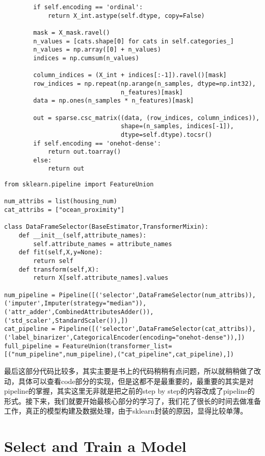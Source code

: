 \documentclass[UTF8]{ctexart}
\begin{document}
\begin{lstlisting}
        if self.encoding == 'ordinal':
            return X_int.astype(self.dtype, copy=False)

        mask = X_mask.ravel()
        n_values = [cats.shape[0] for cats in self.categories_]
        n_values = np.array([0] + n_values)
        indices = np.cumsum(n_values)

        column_indices = (X_int + indices[:-1]).ravel()[mask]
        row_indices = np.repeat(np.arange(n_samples, dtype=np.int32),
                                n_features)[mask]
        data = np.ones(n_samples * n_features)[mask]

        out = sparse.csc_matrix((data, (row_indices, column_indices)),
                                shape=(n_samples, indices[-1]),
                                dtype=self.dtype).tocsr()
        if self.encoding == 'onehot-dense':
            return out.toarray()
        else:
            return out
\end{lstlisting}

\begin{lstlisting}
from sklearn.pipeline import FeatureUnion

num_attribs = list(housing_num)
cat_attribs = ["ocean_proximity"]

class DataFrameSelector(BaseEstimator,TransformerMixin):
    def __init__(self,attribute_names):
        self.attribute_names = attribute_names
    def fit(self,X,y=None):
        return self
    def transform(self,X):
        return X[self.attribute_names].values

num_pipeline = Pipeline([('selector',DataFrameSelector(num_attribs)),('imputer',Imputer(strategy="median")),('attr_adder',CombinedAttributesAdder()),('std_scaler',StandardScaler()),])
cat_pipeline = Pipeline([('selector',DataFrameSelector(cat_attribs)),('label_binarizer',CategoricalEncoder(encoding="onehot-dense")),])
full_pipeline = FeatureUnion(transformer_list=[("num_pipeline",num_pipeline),("cat_pipeline",cat_pipeline),])
\end{lstlisting}	

最后这部分代码比较多，其实主要是书上的代码稍稍有点问题，所以就稍稍做了改动，具体可以查看code部分的实现，但是这都不是最重要的，最重要的其实是对pipeline的掌握，其实这里无非就是把之前的step by step的内容改成了pipeline的形式。接下来，我们就要开始最核心部分的学习了，我们花了很长的时间去做准备工作，真正的模型构建及数据处理，由于sklearn封装的原因，显得比较单薄。

\section{Select and Train a Model}
\end{document}

